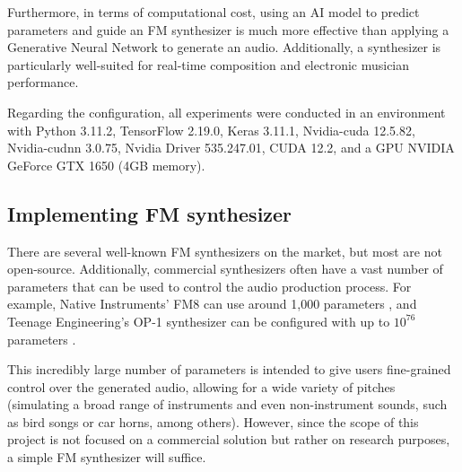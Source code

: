 \documentclass[10pt,conference]{IEEEtran}
\begin{document}
Furthermore, in terms of computational cost, using an AI model to predict parameters and guide an FM synthesizer is much more effective than applying a Generative Neural Network to generate an audio. Additionally, a synthesizer is particularly well-suited for real-time composition and electronic musician performance.

Regarding the configuration, all experiments were conducted in an environment with Python 3.11.2, TensorFlow 2.19.0, Keras 3.11.1, Nvidia-cuda 12.5.82, Nvidia-cudnn 3.0.75, Nvidia Driver 535.247.01, CUDA 12.2, and a GPU NVIDIA GeForce GTX 1650 (4GB memory).


\subsection{Implementing FM synthesizer}

There are several well-known FM synthesizers on the market, but most are not open-source. Additionally, commercial synthesizers often have a vast number of parameters that can be used to control the audio production process. For example, Native Instruments' FM8 can use around 1,000 parameters \cite{claesson2021resynthesis}, and Teenage Engineering’s OP-1 synthesizer can be configured with up to $10^{76}$ parameters \cite{claesson2021resynthesis}.

This incredibly large number of parameters is intended to give users fine-grained control over the generated audio, allowing for a wide variety of pitches (simulating a broad range of instruments and even non-instrument sounds, such as bird songs or car horns, among others). However, since the scope of this project is not focused on a commercial solution but rather on research purposes, a simple FM synthesizer will suffice.
\end{document}
